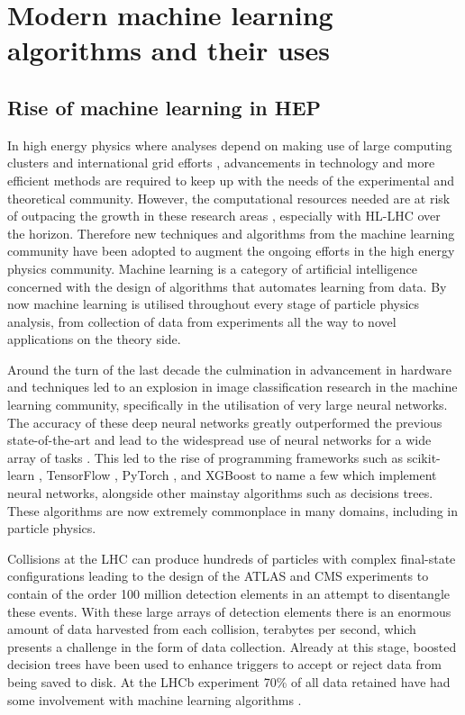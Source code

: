 \documentclass[main.tex]{subfiles}
\begin{document}
\chapter{Modern machine learning algorithms and their uses}
\label{chapter:ml}
\section{Rise of machine learning in HEP}
    In high energy physics where analyses
    depend on making use of large computing clusters
    and international grid efforts \cite{WLCG}, advancements
    in technology and more efficient methods are
    required to keep up with the needs of the
    experimental and theoretical community.
    However, the computational resources needed
    are at risk of outpacing the growth in these research
    areas \cite{Bothmann:2022thx}, especially with
    HL-LHC over the horizon. Therefore new techniques and
    algorithms from the machine learning community
    have been adopted to augment the ongoing efforts
    in the high energy physics community. Machine
    learning is a category of artificial intelligence
    concerned with the design of algorithms that
    automates learning from data.
    By now machine learning is utilised throughout
    every stage of particle physics analysis, from collection
    of data from experiments all the way to novel
    applications on the theory side.

    Around the turn of the last decade the culmination
    in advancement in hardware and techniques led to an
    explosion in image classification research in the
    machine learning community, specifically in the
    utilisation of very large neural networks. The accuracy
    of these deep neural networks greatly outperformed the
    previous state-of-the-art \cite{NIPS2012_c399862d,russakovsky2015imagenet} and
    lead to the widespread use of neural networks for a
    wide array of tasks \cite{Schmidhuber_2015}.
    This led to the rise of programming
    frameworks such as scikit-learn \cite{scikit-learn},
    TensorFlow \cite{tensorflow2015-whitepaper},
    PyTorch \cite{paszke2019pytorch},
    and XGBoost \cite{Chen:2016:XST:2939672.2939785}
    to name a few which implement neural networks, alongside
    other mainstay algorithms such as decisions trees.
    These algorithms are now extremely commonplace
    in many domains, including in particle physics. 

    Collisions at the LHC can produce hundreds of
    particles with complex final-state configurations
    leading to the design of the ATLAS and CMS experiments
    to contain of the order 100 million detection elements
    in an attempt to disentangle these events. With these
    large arrays of detection elements there is an enormous
    amount of data harvested from each collision, terabytes
    per second, which presents a challenge in the form of
    data collection.
    Already at this stage, boosted decision trees
    have been used to enhance triggers \cite{CMS:2020cmk} to accept or
    reject data from being saved to disk. At the LHCb
    experiment 70\% of all data retained have had
    some involvement with machine learning algorithms \cite{LHCb:2014set}.
\end{document}
